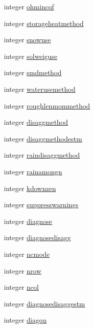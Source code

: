 \begin{DoxyCompactItemize}
\item 
integer \hyperlink{namespacedata__in_a27bd8e1db530bad815c128979003c184}{ohmincqf}
\item 
integer \hyperlink{namespacedata__in_aba572e9ad5577e14bcd393849b1fcdf3}{storageheatmethod}
\item 
integer \hyperlink{namespacedata__in_a43b72c0ea9c40a969cac5f758c240815}{snowuse}
\item 
integer \hyperlink{namespacedata__in_a6cc0dbee756c4ddc20f395bd37f7ad8f}{solweiguse}
\item 
integer \hyperlink{namespacedata__in_a306f10a44e3e8097152fc6a9c0403f6b}{smdmethod}
\item 
integer \hyperlink{namespacedata__in_ab3b82014d0bd4e04ce70642a274dd0dc}{waterusemethod}
\item 
integer \hyperlink{namespacedata__in_ae0baee62dbc6ad6a70c51f5eb1c1882b}{roughlenmommethod}
\item 
integer \hyperlink{namespacedata__in_acdfe353290d799264bab6281a87a1fa7}{disaggmethod}
\item 
integer \hyperlink{namespacedata__in_a672fba472da09ab270c02ec3e92ff9a3}{disaggmethodestm}
\item 
integer \hyperlink{namespacedata__in_ae443b92cf02ecc9331aa9f83b2101f90}{raindisaggmethod}
\item 
integer \hyperlink{namespacedata__in_ac8669fa345dd942fb34ee438634579a4}{rainamongn}
\item 
integer \hyperlink{namespacedata__in_ad7a96eb31a956b650073fc7135d307cd}{kdownzen}
\item 
integer \hyperlink{namespacedata__in_a70af1f33c9424336cb42b8c11bfdf51f}{suppresswarnings}
\item 
integer \hyperlink{namespacedata__in_aa277445969a4533d0db8452d45164762}{diagnose}
\item 
integer \hyperlink{namespacedata__in_a4083646fdfcd997307f15597aa4ec662}{diagnosedisagg}
\item 
integer \hyperlink{namespacedata__in_a8c3e4136805b6c64af2129539988ed09}{ncmode}
\item 
integer \hyperlink{namespacedata__in_ab7209967962bb333a35a29bb6a24eb36}{nrow}
\item 
integer \hyperlink{namespacedata__in_abcffd65e274aa3e20c73561543853e19}{ncol}
\item 
integer \hyperlink{namespacedata__in_ae4cd527d8942c93e41e59584292f2d9c}{diagnosedisaggestm}
\item 
integer \hyperlink{namespacedata__in_a2d6b128b5a2c8b851ee4fdd38204a18f}{diagqn}

\end{DoxyCompactItemize}

